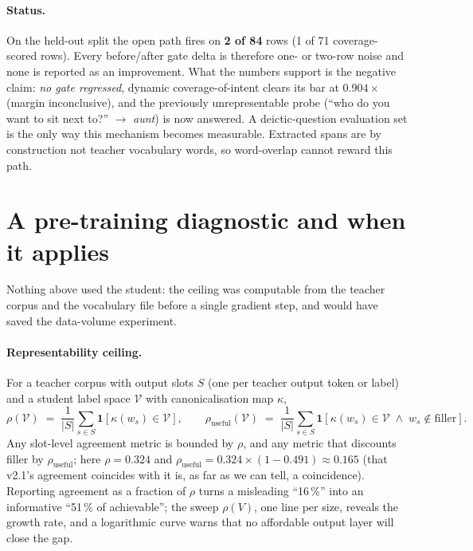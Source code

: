 \paragraph{Status.} On the held-out split the open path fires on \textbf{2 of
84} rows (1 of 71 coverage-scored rows). Every before/after gate delta is
therefore one- or two-row noise and none is reported as an improvement. What
the numbers support is the negative claim: \emph{no gate regressed}, dynamic
coverage-of-intent clears its bar at $0.904\times$ (margin inconclusive), and the
previously unrepresentable probe (``who do you want to sit next to?'' $\to$
\emph{aunt}) is now answered. A deictic-question evaluation
set is the only way this mechanism becomes measurable. Extracted spans are by construction
not teacher vocabulary words, so word-overlap cannot reward this path.

\section{A pre-training diagnostic and when it applies}
\label{sec:general}
Nothing above used the student: the ceiling was computable from the teacher
corpus and the vocabulary file before a single gradient step, and would have
saved the data-volume experiment.

\paragraph{Representability ceiling.} For a teacher corpus with output slots
$S$ (one per teacher output token or label) and a student label space
$\mathcal{V}$ with canonicalisation map $\kappa$,
\begin{equation}
\rho(\mathcal V)\;=\;\frac{1}{|S|}\sum_{s\in S}\mathbf 1\!\left[\kappa(w_s)\in\mathcal V\right],
\qquad
\rho_{\text{useful}}(\mathcal V)\;=\;\frac{1}{|S|}\sum_{s\in S}\mathbf 1\!\left[\kappa(w_s)\in\mathcal V\;\wedge\;w_s\notin\text{filler}\right].
\label{eq:rho}
\end{equation}
Any slot-level agreement metric is bounded by $\rho$, and any metric that
discounts filler by $\rho_{\text{useful}}$; here $\rho=0.324$ and
$\rho_{\text{useful}}=0.324\times(1-0.491)\approx0.165$ (that v2.1's agreement
coincides with it is, as far as we can tell, a coincidence). Reporting
agreement as a fraction of $\rho$ turns a misleading ``16\,\%'' into an
informative ``51\,\% of achievable''; the sweep $\rho(V)$, one line per size,
reveals the growth rate, and a logarithmic curve warns that no affordable
output layer will close the gap.

